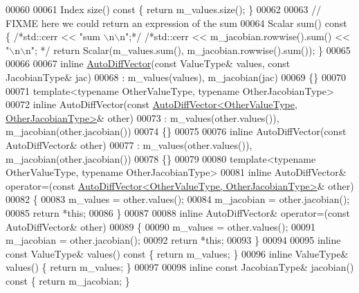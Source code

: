 \begin{DoxyCode}
00060 
00061     Index size()\textcolor{keyword}{ const }\{ \textcolor{keywordflow}{return} m\_values.size(); \}
00062 
00063     \textcolor{comment}{// FIXME here we could return an expression of the sum}
00064     Scalar sum()\textcolor{keyword}{ const }\{ \textcolor{comment}{/*std::cerr << "sum \(\backslash\)n\(\backslash\)n";*/} \textcolor{comment}{/*std::cerr << m\_jacobian.rowwise().sum() << "\(\backslash\)n\(\backslash\)n";
      */} \textcolor{keywordflow}{return} Scalar(m\_values.sum(), m\_jacobian.rowwise().sum()); \}
00065 
00066 
00067     \textcolor{keyword}{inline} \hyperlink{class_eigen_1_1_auto_diff_vector}{AutoDiffVector}(\textcolor{keyword}{const} ValueType& values, \textcolor{keyword}{const} JacobianType& jac)
00068       : m\_values(values), m\_jacobian(jac)
00069     \{\}
00070 
00071     \textcolor{keyword}{template}<\textcolor{keyword}{typename} OtherValueType, \textcolor{keyword}{typename} OtherJacobianType>
00072     \textcolor{keyword}{inline} AutoDiffVector(\textcolor{keyword}{const} 
      \hyperlink{class_eigen_1_1_auto_diff_vector}{AutoDiffVector<OtherValueType, OtherJacobianType>}& other)
00073       : m\_values(other.values()), m\_jacobian(other.jacobian())
00074     \{\}
00075 
00076     \textcolor{keyword}{inline} AutoDiffVector(\textcolor{keyword}{const} AutoDiffVector& other)
00077       : m\_values(other.values()), m\_jacobian(other.jacobian())
00078     \{\}
00079 
00080     \textcolor{keyword}{template}<\textcolor{keyword}{typename} OtherValueType, \textcolor{keyword}{typename} OtherJacobianType>
00081     \textcolor{keyword}{inline} AutoDiffVector& operator=(\textcolor{keyword}{const} 
      \hyperlink{class_eigen_1_1_auto_diff_vector}{AutoDiffVector<OtherValueType, OtherJacobianType>}& other)
00082     \{
00083       m\_values = other.values();
00084       m\_jacobian = other.jacobian();
00085       \textcolor{keywordflow}{return} *\textcolor{keyword}{this};
00086     \}
00087 
00088     \textcolor{keyword}{inline} AutoDiffVector& operator=(\textcolor{keyword}{const} AutoDiffVector& other)
00089     \{
00090       m\_values = other.values();
00091       m\_jacobian = other.jacobian();
00092       \textcolor{keywordflow}{return} *\textcolor{keyword}{this};
00093     \}
00094 
00095     \textcolor{keyword}{inline} \textcolor{keyword}{const} ValueType& values()\textcolor{keyword}{ const }\{ \textcolor{keywordflow}{return} m\_values; \}
00096     \textcolor{keyword}{inline} ValueType& values() \{ \textcolor{keywordflow}{return} m\_values; \}
00097 
00098     \textcolor{keyword}{inline} \textcolor{keyword}{const} JacobianType& jacobian()\textcolor{keyword}{ const }\{ \textcolor{keywordflow}{return} m\_jacobian; \}

\end{DoxyCode}
